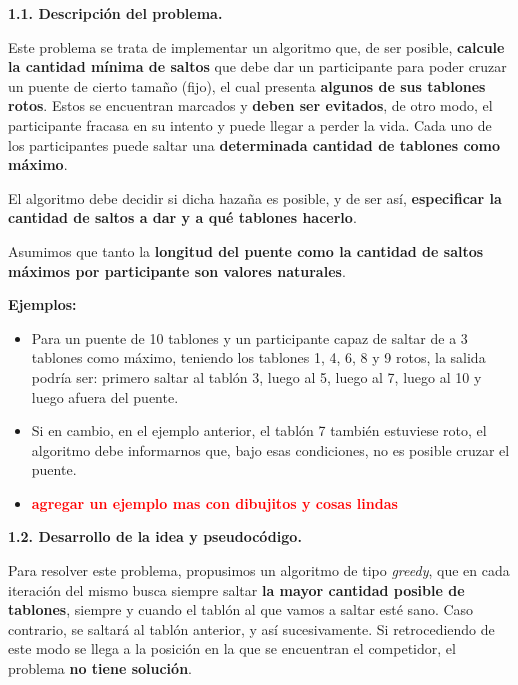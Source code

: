 \noindent
\textbf{1.1. Descripción del problema.}

\vspace*{0.3cm}

Este problema se trata de implementar un algoritmo que, de ser posible, 
\textbf{calcule la cantidad mínima de saltos} que debe dar un participante para poder cruzar un 
puente de cierto tamaño (fijo), el cual presenta \textbf{algunos de sus tablones rotos}. Estos se encuentran 
marcados y \textbf{deben ser evitados}, de otro modo, el participante fracasa en su intento y puede llegar a 
perder la vida. Cada uno de los participantes puede saltar una \textbf{determinada cantidad de tablones como máximo}. \medskip

El algoritmo debe decidir si dicha hazaña es posible, y de ser así, 
\textbf{especificar la cantidad de saltos a dar y a qué tablones hacerlo}. \medskip

Asumimos que tanto la \textbf{longitud del puente como la cantidad de saltos máximos por participante
son valores naturales}.

\vspace*{0.5cm}

\textbf{Ejemplos:}
\begin{itemize}
  \item Para un puente de 10 tablones y un participante capaz de saltar de a 3
  tablones como máximo, teniendo los tablones 1, 4, 6, 8 y 9 rotos, la salida podría ser: 
  primero saltar al tablón 3, luego al 5, luego al 7, luego al 10 y luego afuera del puente.
  \item Si en cambio, en el ejemplo anterior, el tablón 7 también estuviese roto,
  el algoritmo debe informarnos que, bajo esas condiciones, no es posible cruzar el puente.
  \item \textcolor{red}{\textbf{agregar un ejemplo mas con dibujitos y cosas lindas}}
\end{itemize}


\vspace*{0.75cm} \noindent



\noindent
\textbf{1.2. Desarrollo de la idea y pseudocódigo.}

\vspace*{0.3cm}

Para resolver este problema, propusimos un algoritmo de tipo \textit{greedy}, que en cada iteración
del mismo busca siempre saltar \textbf{la mayor cantidad posible de tablones}, siempre y cuando el 
tablón al que vamos a saltar esté sano. Caso contrario, se saltará al tablón anterior, y así sucesivamente.
Si retrocediendo de este modo se llega a la posición en la que se encuentran el competidor, el problema
\textbf{no tiene solución}.

